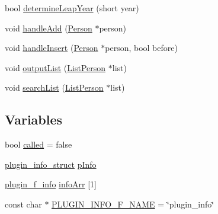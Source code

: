 \begin{DoxyCompactItemize}
\item 
bool \hyperlink{namespace_h_t_w_1_1_a_i_1_1_beleg_1_1_plugin_af447adca55924591672a0a48e5b2135c}{determine\-Leap\-Year} (short year)
\item 
void \hyperlink{namespace_h_t_w_1_1_a_i_1_1_beleg_1_1_plugin_a49690271791d29e3adcc639c8e1d7507}{handle\-Add} (\hyperlink{struct_h_t_w_1_1_a_i_1_1_beleg_1_1_person}{Person} $\ast$person)
\item 
void \hyperlink{namespace_h_t_w_1_1_a_i_1_1_beleg_1_1_plugin_a5e9d426365a4cf0152d88834dc9cfe07}{handle\-Insert} (\hyperlink{struct_h_t_w_1_1_a_i_1_1_beleg_1_1_person}{Person} $\ast$person, bool before)
\item 
void \hyperlink{namespace_h_t_w_1_1_a_i_1_1_beleg_1_1_plugin_aa90c96c07b27cfce9f82e3e6fbfb0cbd}{output\-List} (\hyperlink{struct_h_t_w_1_1_a_i_1_1_beleg_1_1_list_person}{List\-Person} $\ast$list)
\item 
void \hyperlink{namespace_h_t_w_1_1_a_i_1_1_beleg_1_1_plugin_a0c847ae744fcffef5ca145de3acf5f81}{search\-List} (\hyperlink{struct_h_t_w_1_1_a_i_1_1_beleg_1_1_list_person}{List\-Person} $\ast$list)
\end{DoxyCompactItemize}
\subsection*{Variables}
\begin{DoxyCompactItemize}
\item 
bool \hyperlink{namespace_h_t_w_1_1_a_i_1_1_beleg_1_1_plugin_af4caea43df274d3c07b7995b1b75cea0}{called} = false
\item 
\hyperlink{struct_h_t_w_1_1_a_i_1_1_beleg_1_1_plugin_1_1plugin__info__struct}{plugin\-\_\-info\-\_\-struct} \hyperlink{namespace_h_t_w_1_1_a_i_1_1_beleg_1_1_plugin_a853f5a9bf6edef9b228b84cff3c71dc5}{p\-Info}
\item 
\hyperlink{struct_h_t_w_1_1_a_i_1_1_beleg_1_1_plugin_1_1plugin__f__info}{plugin\-\_\-f\-\_\-info} \hyperlink{namespace_h_t_w_1_1_a_i_1_1_beleg_1_1_plugin_a7dc1c25d83285520a29dbb1fed5a37c2}{info\-Arr} \mbox{[}1\mbox{]}
\item 
const char $\ast$ \hyperlink{namespace_h_t_w_1_1_a_i_1_1_beleg_1_1_plugin_ae1feecb2d4486345d2cb0ce3bed02d63}{P\-L\-U\-G\-I\-N\-\_\-\-I\-N\-F\-O\-\_\-\-F\-\_\-\-N\-A\-M\-E} = \char`\"{}plugin\-\_\-info\char`\"{}
\end{DoxyCompactItemize}


